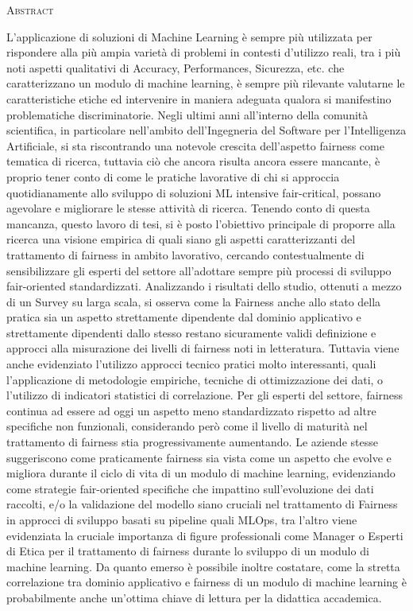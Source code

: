 
\begin{center}
    \LARGE \textsc{Abstract}
\end{center}


L'applicazione di soluzioni di Machine Learning è sempre più utilizzata per rispondere alla più ampia varietà di problemi in contesti d'utilizzo reali, tra i più noti aspetti qualitativi di Accuracy, Performances, Sicurezza, etc. che caratterizzano un modulo di machine learning, è sempre più rilevante valutarne le caratteristiche etiche ed intervenire in maniera adeguata qualora si manifestino problematiche discriminatorie. Negli ultimi anni all'interno della comunità scientifica, in particolare nell'ambito dell'Ingegneria del Software per l'Intelligenza Artificiale, si sta riscontrando una  notevole crescita dell'aspetto fairness come tematica di ricerca, tuttavia ciò che ancora risulta ancora essere mancante, è proprio tener conto di come le pratiche lavorative di chi si approccia quotidianamente allo sviluppo di soluzioni ML intensive fair-critical, possano agevolare e migliorare le stesse attività di ricerca. Tenendo conto di questa mancanza, questo lavoro di tesi, si è posto l'obiettivo principale di proporre alla ricerca una visione empirica di quali siano gli aspetti caratterizzanti del trattamento di fairness in ambito lavorativo, cercando contestualmente di sensibilizzare gli esperti del settore all'adottare sempre più processi di sviluppo fair-oriented standardizzati. Analizzando i risultati dello studio, ottenuti a mezzo di un Survey su larga scala, si osserva come la Fairness anche allo stato della pratica sia un aspetto strettamente dipendente dal dominio applicativo e strettamente dipendenti dallo stesso restano sicuramente validi definizione e approcci alla misurazione dei livelli di fairness noti in letteratura. Tuttavia viene anche evidenziato l'utilizzo approcci tecnico pratici molto interessanti, quali l'applicazione di metodologie empiriche, tecniche di ottimizzazione dei dati, o l'utilizzo di indicatori statistici di correlazione. Per gli esperti del settore, fairness continua ad essere ad oggi un aspetto meno standardizzato rispetto ad altre specifiche non funzionali, considerando però come il livello di maturità nel trattamento di fairness stia progressivamente aumentando. Le aziende stesse suggeriscono come praticamente fairness sia vista come un aspetto che evolve e migliora durante il ciclo di vita di un modulo di machine learning, evidenziando come strategie fair-oriented specifiche che impattino sull'evoluzione dei dati raccolti, e/o la validazione del modello siano cruciali nel trattamento di Fairness in approcci di sviluppo basati su pipeline quali MLOps, tra l'altro viene evidenziata la cruciale importanza di figure professionali come Manager o Esperti di Etica per il trattamento di fairness durante lo sviluppo di un modulo di machine learning. Da quanto emerso è possibile inoltre costatare, come la stretta correlazione tra dominio applicativo e fairness di un modulo di machine learning è probabilmente anche un'ottima chiave di lettura per la didattica accademica.

